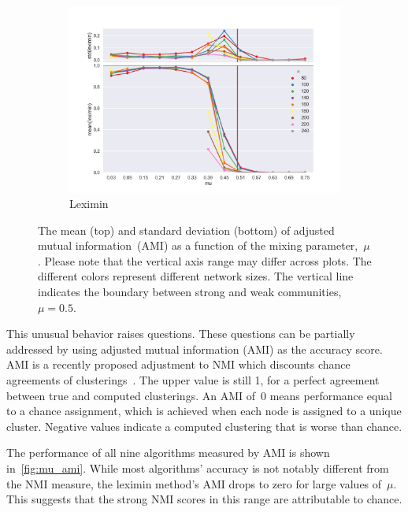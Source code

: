 \begin{figure}
    \begin{subfigure}[b]{0.32\textwidth}
        \includegraphics[width=\textwidth]{fig/ami_vs_mu_leximin}
        \caption{Leximin}
        \label{fig:mouse}
    \end{subfigure}

  \caption{The mean (top) and standard deviation (bottom) of adjusted mutual information~(AMI) as a function of the mixing parameter,~$\mu$. Please note that the vertical axis range may differ across plots. The different colors represent different network sizes. The vertical line indicates the boundary between strong and weak communities, $\mu = 0.5$.}
  \label{fig:mu_ami}
\end{figure}

This unusual behavior raises questions. These questions can be partially addressed by using adjusted mutual information (AMI) as the accuracy score. AMI is a recently proposed adjustment to NMI which discounts chance agreements of clusterings~\cite{vinh2009information}. The upper value is still 1, for a perfect agreement between true and computed clusterings. An AMI of~0 means performance equal to a chance assignment, which is achieved when each node is assigned to a unique cluster. Negative values indicate a computed clustering that is worse than chance.

The performance of all nine algorithms measured by AMI is shown in~\autoref{fig:mu_ami}. While most algorithms' accuracy is not notably different from the NMI measure, the leximin method's AMI drops to zero for large values of~$\mu$. This suggests that the strong NMI scores in this range are attributable to chance.

